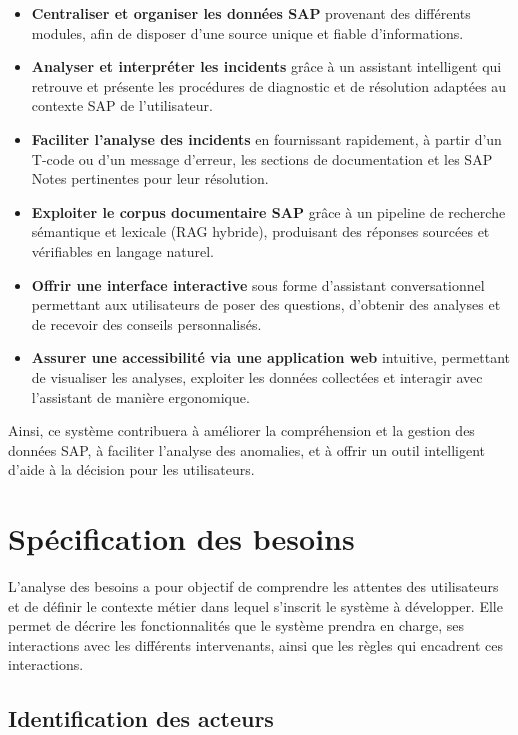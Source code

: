 \begin{itemize}
    \item \textbf{Centraliser et organiser les données SAP} provenant des différents modules, afin de disposer d'une source unique et fiable d'informations.
    \item \textbf{Analyser et interpréter les incidents} grâce à un assistant intelligent qui retrouve et présente les procédures de diagnostic et de résolution adaptées au contexte SAP de l'utilisateur.
    \item \textbf{Faciliter l'analyse des incidents} en fournissant rapidement, à partir d'un T-code ou d'un message d'erreur, les sections de documentation et les SAP Notes pertinentes pour leur résolution.
    \item \textbf{Exploiter le corpus documentaire SAP} grâce à un pipeline de recherche sémantique et lexicale (RAG hybride), produisant des réponses sourcées et vérifiables en langage naturel.
    \item \textbf{Offrir une interface interactive} sous forme d'assistant conversationnel permettant aux utilisateurs de poser des questions, d'obtenir des analyses et de recevoir des conseils personnalisés.
    \item \textbf{Assurer une accessibilité via une application web} intuitive, permettant de visualiser les analyses, exploiter les données collectées et interagir avec l'assistant de manière ergonomique.
\end{itemize}

Ainsi, ce système contribuera à améliorer la compréhension et la gestion des données SAP, à faciliter l'analyse des anomalies, et à offrir un outil intelligent d'aide à la décision pour les utilisateurs.

\section{Spécification des besoins}
\label{sec:specification_besoins}

L'analyse des besoins a pour objectif de comprendre les attentes des utilisateurs et de définir le
contexte métier dans lequel s'inscrit le système à développer. Elle permet de décrire
les fonctionnalités que le système prendra en charge, ses interactions avec les différents
intervenants, ainsi que les règles qui encadrent ces interactions.

\subsection{Identification des acteurs}

